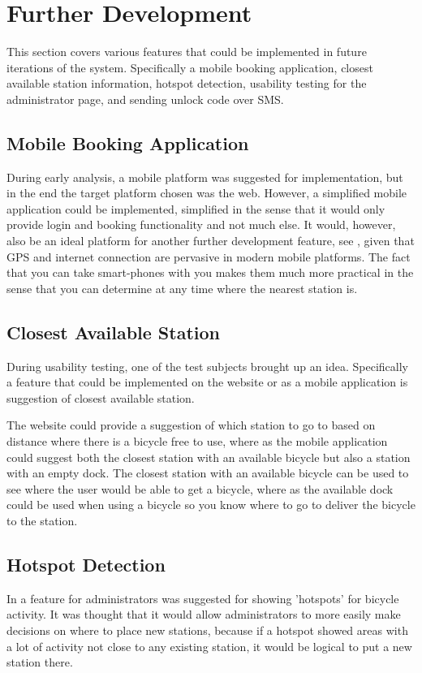 \section{Further Development}\label{sec:furdev}
This section covers various features that could be implemented in future iterations of the system. Specifically a mobile booking application, closest available station information, hotspot detection, usability testing for the administrator page, and sending unlock code over SMS. 

\subsection{Mobile Booking Application}\label{sec:fd-mobileapp}
During early analysis, a mobile platform was suggested for implementation, but in the end the target platform chosen was the web. 
However, a simplified mobile application could be implemented, simplified in the sense that it would only provide login and booking functionality and not much else.
It would, however, also be an ideal platform for another further development feature, see , given that GPS and internet connection are pervasive in modern mobile platforms.
The fact that you can take smart-phones with you makes them much more practical in the sense that you can determine at any time where the nearest station is.

\subsection{Closest Available Station}\label{subsec:closeststation}
During usability testing, one of the test subjects brought up an idea.
Specifically a feature that could be implemented on the website or as a mobile application is suggestion of closest available station.

The website could provide a suggestion of which station to go to based on distance where there is a bicycle free to use, where as the mobile application could suggest both the closest station with an available bicycle but also a station with an empty dock.
The closest station with an available bicycle can be used to see where the user would be able to get a bicycle, where as the available dock could be used when using a bicycle so you know where to go to deliver the bicycle to the station.

\subsection{Hotspot Detection}
In  a feature for administrators was suggested for showing 'hotspots' for bicycle activity. 
It was thought that it would allow administrators to more easily make decisions on where to place new stations, because if a hotspot showed areas with a lot of activity not close to any existing station, it would be logical to put a new station there.

